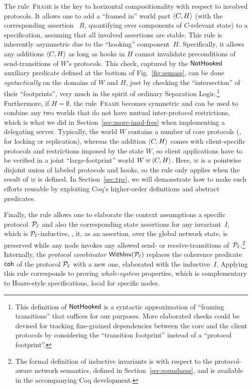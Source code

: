 The rule~\textsc{Frame} is the key to horizontal compositionality with
respect to involved protocols. It allows one to add a ``framed in''
world part $\langle{C, H}\rangle$ (with the corresponding assertion ~$R$,
quantifying over components of $C$-relevant state) to a specification,
assuming that all involved assertions are stable.
%
This rule is inherently asymmetric due to the ``hooking''
component~$H$. Specifically, it allows any additions $\langle{C, H}\rangle$
as long as hooks in $H$ cannot invalidate preconditions of
send-transitions of $W$'s protocols. This check, captured by the
$\mathsf{NotHooked}$ auxiliary predicate defined at the bottom of
Fig.~\ref{fig:semass}, can be done \emph{syntactically} on the domains
of $W$ and $H$, just by checking the ``intersection'' of their
``footprints'', very much in the spirit of ordinary Separation
Logic.\footnote{This definition of $\mathsf{NotHooked}$ is a syntactic
  approximation of ``framing \wrt transitions'' that suffices for our
  purposes. More elaborated checks could be devised for tracking
  fine-grained dependencies between the core and the client protocols
  by considering the ``transition footprint'' instead of a ``protocol
  footprint''.}
%
Furthermore, if $H = \emptyset$, the rule~\textsc{Frame}
becomes symmetric and can be used to combine any two worlds that do
not have mutual inter-protocol restrictions, which is what we did in
Section~\ref{sec:more-impl-free} when implementing a delegating
server.
%
Typically, the world $W$ contains a number of core protocols (\eg, for
locking or replication), whereas the addition $\langle{C, H}\rangle$ comes
with client-specific protocols and restrictions imposed by the state
\wrt $W$, so client applications have to be verified in a joint
``large-footprint'' world $W \uplus \langle{C, H}\rangle$. Here, $\uplus$ is a
pointwise disjoint union of labeled protocols and hooks, so the rule
only applies when the result of $\uplus$ is defined.
%
In Section~\ref{sec:tpc}, we will demonstrate how to make such efforts
reusable by exploiting Coq's higher-order definitions and abstract
predicates.

Finally, the rule  allows one to elaborate the context
assumptions \wrt a specific protocol~$\mathcal{P}_\ell$ and also the
corresponding state assertions for any invariant~$I$, which is
$\mathcal{P}_\ell$-inductive, \ie, it, as an assertion, over the global
network state, is preserved while any node invokes any allowed send-
or receive-transitions of~$\mathcal{P}_\ell$.\footnote{The formal definition
  of inductive invariants is with respect to the protocol-aware
  network semantics, defined in Section~\ref{sec:soundness}, and is
  available in the accompanying Coq development.}
%
Internally, the \emph{protocol combinator} $\mathsf{WithInv}(\mathcal{P}_\ell)$
replaces the coherence predicate $\mathsf{coh}$ of the protocol $\mathcal{P}_\ell$
with a new one, elaborated with the inductive~$I$.
%
Applying this rule corresponds to proving \emph{whole-system}
properties, which is complementary to Hoare-style specifications,
local for specific nodes.


